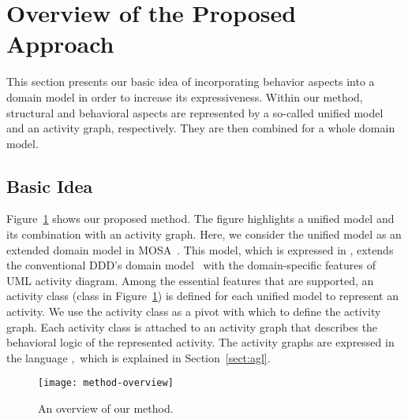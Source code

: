 \section{Overview of the Proposed Approach}
\label{sect:overviewApproach}

This section presents our basic idea of incorporating behavior aspects into a domain model in order to increase its expressiveness. Within our method, structural and behavioral aspects are represented by a so-called unified model and an activity graph, respectively. They are then combined for a whole domain model.

\subsection{Basic Idea}

%
%
Figure~\ref{fig:method-overview} shows our proposed method.
The figure highlights a unified model and its combination with an activity graph. Here, we consider the unified model as an extended domain model in MOSA~\cite{le_domain_2018}. This model, which is expressed in \dcsl, extends the conventional DDD's domain model~\cite{evans_domain-driven_2004} with the domain-specific features of UML activity diagram. Among the essential features that are supported, an activity class (\eg class  in Figure~\ref{fig:method-overview}) is defined for each unified model to represent an activity. We use the activity class as a pivot with which to define the activity graph. Each activity class is attached to an activity graph that describes the behavioral logic of the represented activity. The activity graphs are expressed in the language \agl,~which is explained in Section~\ref{sect:agl}.

\begin{figure}[ht]
	\begin{center}
		\texttt{[image: method-overview]}
	\end{center}
	\caption{An overview of our method.} %
	\label{fig:method-overview}
\end{figure}

